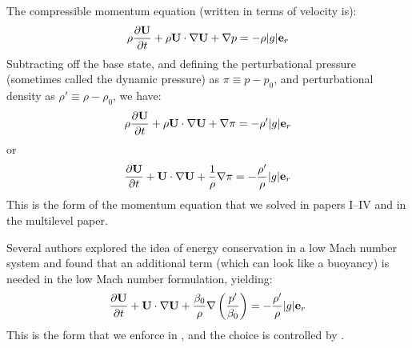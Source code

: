 The compressible momentum equation (written in terms of velocity is):
\begin{equation}
\rho \frac{\partial {\bf U}}{\partial t} + \rho {\bf U} \cdot \nabla {\bf U} + \nabla p = -\rho |g| \mathbf{e}_r
\end{equation}
Subtracting off the base state, and defining the perturbational
pressure (sometimes called the dynamic pressure) as $\pi \equiv p - p_0$,
and perturbational density as $\rho' \equiv \rho - \rho_0$, we have:
\begin{equation}
\rho \frac{\partial {\bf U}}{\partial t} + \rho {\bf U} \cdot \nabla {\bf U} + \nabla \pi = -\rho' |g| \mathbf{e}_r
\end{equation}
or
\begin{equation}
\frac{\partial {\bf U}}{\partial t} + {\bf U} \cdot \nabla {\bf U} + \frac{1}{\rho} \nabla \pi =
   -\frac{\rho^\prime}{\rho} |g| \mathbf{e}_r
\end{equation}
This is the form of the momentum equation that we solved in papers
I--IV and in the multilevel paper.

Several authors \cite{KP:2012,VLBWZ:2013} explored the idea of energy
conservation in a low Mach number system and found that an additional
term (which can look like a buoyancy) is needed in the low Mach number
formulation, yielding:
\begin{equation}
\frac{\partial {\bf U}}{\partial t} + {\bf U} \cdot \nabla {\bf U} +
   \frac{\beta_0}{\rho} \nabla \left (\frac{p^\prime}{\beta_0} \right ) =
   -\frac{\rho^\prime}{\rho} |g| \mathbf{e}_r
\label{eq:flow:newmomentum}
\end{equation}
This is the form that we enforce in \maestroex, and the choice is controlled
by .

